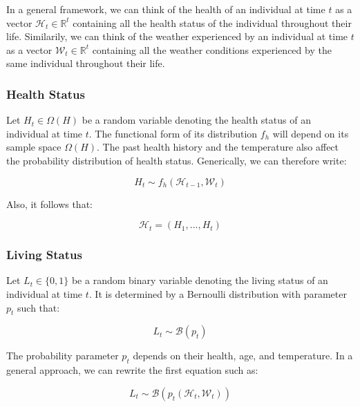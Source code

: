 \documentclass{article}
\begin{document}
In a general framework, we can think of the health of an individual at time $t$ as a vector $\mathcal{H}_t\in \mathbb{R}^{t}$ containing
all the health status of the individual throughout their life.
Similarily, we can think of the weather experienced by an individual at time $t$ as a vector $\mathcal{W}_t\in \mathbb{R}^{t}$ containing
all the weather conditions experienced by the same individual throughout their life.

\subsubsection{Health Status}

Let $H_{t}\in\Omega(H)$ be a random variable denoting the health status of an individual at time $t$.
The functional form of its distribution $f_{h}$ will depend on its sample space $\Omega(H)$. 
The past health history and the temperature also affect the probability distribution of health status.
Generically, we can therefore write: 

\begin{equation}
    H_{t}\sim f_{h}(\mathcal{H}_{t-1},\mathcal{W}_t)
\end{equation}

Also, it follows that: 

\begin{equation}
    \mathcal{H}_{t} = (H_{1},...,H_{t})
\end{equation}

\subsubsection{Living Status}

Let $L_{t}\in\{0,1\}$ be a random binary variable denoting the living status of an individual at time $t$.
It is determined by a Bernoulli distribution with parameter $p_t$ such that: 

\begin{equation}
    L_{t} \sim \mathcal{B}(p_{t})
\end{equation}

The probability parameter $p_{t}$ depends on their health, age, and temperature.
In a general approach, we can rewrite the first equation such as: 

\begin{equation}
    L_{t} \sim \mathcal{B}(p_{t}(\mathcal{H}_t,\mathcal{W}_t))
\end{equation}

% 
\end{document}
